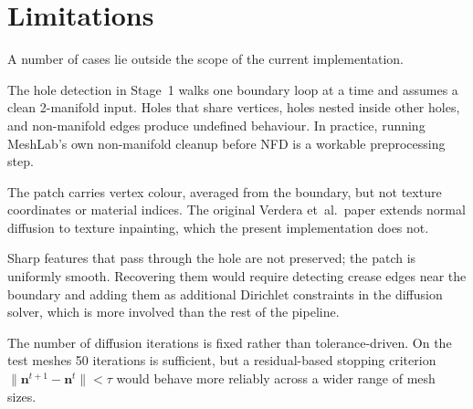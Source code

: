 \section{Limitations}

A number of cases lie outside the scope of the current implementation.

The hole detection in Stage~1 walks one boundary loop at a time and assumes a clean 2-manifold input. Holes that share vertices, holes nested inside other holes, and non-manifold edges produce undefined behaviour. In practice, running MeshLab's own non-manifold cleanup before NFD is a workable preprocessing step.

The patch carries vertex colour, averaged from the boundary, but not texture coordinates or material indices. The original Verdera et~al.\ paper extends normal diffusion to texture inpainting, which the present implementation does not.

Sharp features that pass through the hole are not preserved; the patch is uniformly smooth. Recovering them would require detecting crease edges near the boundary and adding them as additional Dirichlet constraints in the diffusion solver, which is more involved than the rest of the pipeline.

The number of diffusion iterations is fixed rather than tolerance-driven. On the test meshes 50 iterations is sufficient, but a residual-based stopping criterion $\|\mathbf{n}^{t+1} - \mathbf{n}^{t}\| < \tau$ would behave more reliably across a wider range of mesh sizes.
